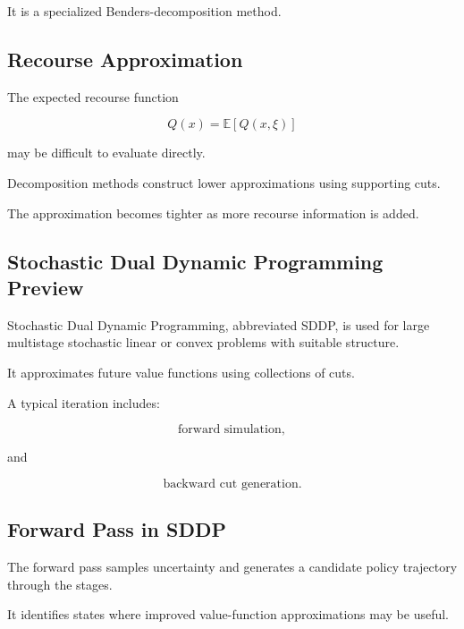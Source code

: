 It is a specialized Benders-decomposition method.

\subsection{Recourse Approximation}
\label{subsec:recourse-approximation}

The expected recourse function

\[
\boxed{
Q(x)
=
\mathbb{E}
[
Q(x,\xi)
]
}
\]

may be difficult to evaluate directly.

Decomposition methods construct lower approximations using supporting
cuts.

The approximation becomes tighter as more recourse information is added.

\subsection{Stochastic Dual Dynamic Programming Preview}
\label{subsec:stochastic-dual-dynamic-programming}

Stochastic Dual Dynamic Programming, abbreviated SDDP, is used for large
multistage stochastic linear or convex problems with suitable structure.

It approximates future value functions using collections of cuts.

A typical iteration includes:

\[
\boxed{
\text{forward simulation},
}
\]

and

\[
\boxed{
\text{backward cut generation}.
}
\]

\subsection{Forward Pass in SDDP}
\label{subsec:sddp-forward-pass}

The forward pass samples uncertainty and generates a candidate policy
trajectory through the stages.

It identifies states where improved value-function approximations may be
useful.

